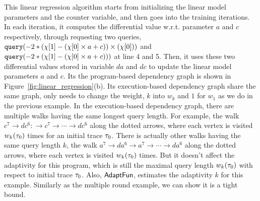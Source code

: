 This linear regression algorithm starts from initializing the linear model parameters and the counter variable,
and then goes into the training iterations.
In each iteration, it computes the differential value w.r.t. parameter
$a$ and $c$ respectively,
through requesting two queries, ${\tt query}(-2 * (\chi[1] - (\chi[0]\times a + c)) \times (\chi[0]))$ and 
${\tt query}(-2 * (\chi[1] - (\chi[0]\times a + c)))$
at line 4 and 5.
Then, it uses these two differential values stored in variable $da$ and $dc$ to update the linear model parameters $a$ and $c$.
%
Its the program-based dependency graph is shown in Figure~\ref{fig:linear_regression}(b). Its execution-based dependency graph share the same graph, only needs to change the weight, $k$ into $w_k$ and $1$ for $w_1$ as we do in the previous example.
In the execution-based dependency graph, there are multiple walks having the same longest query length.
For example, the walk $c^7 \to dc^6 : \to c^7 \to \cdots \to dc^6$ along the 
dotted arrows, where each vertex is visited $w_k(\mathtt{\tau}_0)$ times for an initial trace $\mathtt{\tau}_0$.
There is actually other walks having the same query length $k$, the 
walk $a^7 \to da^6  \to a^7 \to \cdots \to da^6 $ along the 
dotted arrows, where each vertex is visited $w_k(\mathtt{\tau}_0)$ times.
But it doesn't affect the adaptivity for this program, which is still the maximal query length $w_k(\mathtt{\tau}_0)$ with respect to initial trace $\mathtt{\tau}_0$.
Also, $\textsf{AdaptFun}$, estimates the adaptivity $k$ for this example. Similarly as the multiple round example, we can show it is a tight bound.
%